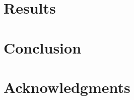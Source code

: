 \documentclass{article} %
\begin{document}
\section{Results} \label{section:results}

\section{Conclusion} \label{section:conclusion}

\section*{Acknowledgments}


\printbibliography
\end{document}
